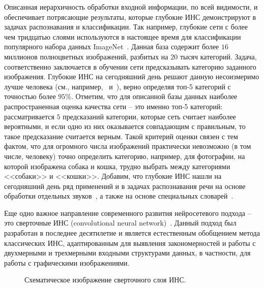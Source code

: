 \documentclass[a4paper,12pt,russian]{article} %
\begin{document}
Описанная иерархичность обработки входной информации, по всей видимости, и обеспечивает потрясающие результаты, которые глубокие ИНС демонстрируют в задачах распознавания и классификации.
Так например, глубокие сети с более чем тридцатью слоями используются в настоящее время для классификации популярного набора данных ImageNet~\cite{deng2009imagenet}.
Данная база содержит более $16$ миллионов полноцветных изображений, разбитых на $20$ тысяч категорий.
Задача, соответственно заключается в обучении сети предсказывать категорию заданного изображения.
Глубокие ИНС на сегодняшний день решают данную несоизмеримо лучше человека (см., например,~\cite{le2013building} и~\cite{ciregan2012multi}), верно определяя топ-5 категорий с точностью более $95\%$.
Отметим, что для описанной базы данных наиболее распространенная оценка качества сети -- это именно топ-5 категорий: рассматривается $5$ предсказаний категории, которые сеть считает наиболее вероятными, и если одно из них оказывается совпадающим с правильным, то такое предсказание считается верным.
Такой критерий оценки связен с тем фактом, что для огромного числа изображений практически невозможно (в том числе, человеку) точно определить категорию, например, для фотографии, на которой изображена собака и кошка, трудно выбрать между категориями <<собаки>> и <<кошки>>.
Добавим, что глубокие ИНС нашли на сегодняшний день ряд применений и в задачах распознавания речи на основе обработки отдельных звуков~\cite{hinton2012deep}, а также на основе специальных словарей~\cite{dahl2012context}.

Еще одно важное направление современного развития нейросетевого подхода -- это сверточные ИНС (convolutional neural network)~\cite{krizhevsky2012imagenet, szegedy2015going}.
Данный подход был разработан в последнее десятилетие и является естественным  обобщением метода классических ИНС, адаптированным для выявления закономерностей и работы с двухмерными и трехмерными входными структурами  данных, в частности, для работы с графическими изображениями.

\begin{figure}[t!]
	\caption{
		Схематическое изображение сверточного слоя ИНС.
        }
        \label{fig:nn_conv_layer}
\end{figure}
\end{document}
